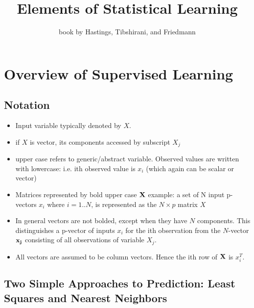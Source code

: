 \documentclass[a4paper]{report}
\title{Elements of Statistical Learning}
\author{book by Hastings, Tibshirani, and Friedmann}
\date{}
\begin{document}
\maketitle
\setcounter{chapter}{1}
\chapter{Overview of Supervised Learning}
\section{Notation}
\begin{itemize}
  \item Input variable typically denoted by $X$. 
  \item if $X$ is vector, its components accessed by subscript $X_j$
  \item upper case refers to generic/abstract variable. Observed values are written with lowercase: i.e. ith observed value is $x_i$ (which again can be scalar or vector)
  \item Matrices represented by bold upper case $\bf X$
    \subitem example: a set of N input p-vectors $x_i$ where $i=1..N$, is represented as the $N\times p$ matrix $X$
  \item In general vectors are not bolded, except when they have $N$ components. This distinguishes a p-vector of inputs $x_i$ for the ith observation from the $N$-vector $\bf x_j$ consisting of all observations of variable $X_j$.
  \item All vectors are assumed to be column vectors. Hence the ith row of $\bf X$ is $x_i^T$.
\end{itemize}

\section{Two Simple Approaches to Prediction: Least Squares and Nearest Neighbors}
\end{document}
